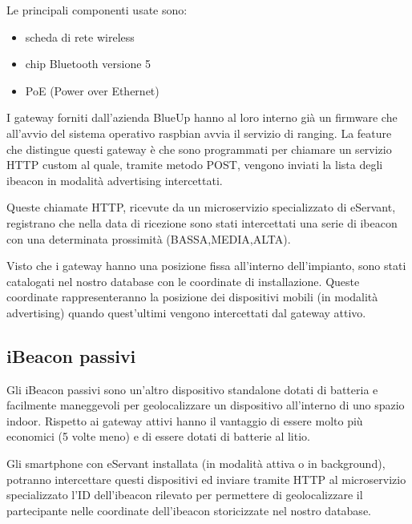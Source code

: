 Le principali componenti usate sono:
\begin{itemize}
    \item scheda di rete wireless
    \item chip Bluetooth versione 5
    \item PoE (Power over Ethernet)
\end{itemize}

I gateway forniti dall'azienda BlueUp hanno al loro interno già un firmware che all'avvio del sistema operativo
raspbian avvia il servizio di ranging.
La feature che distingue questi gateway è che sono programmati per chiamare un servizio HTTP custom 
al quale, tramite metodo POST, vengono inviati la lista degli ibeacon in modalità advertising intercettati.

Queste chiamate HTTP, ricevute da un microservizio specializzato di eServant, registrano che nella data
di ricezione sono stati intercettati una serie di ibeacon con una determinata prossimità (BASSA,MEDIA,ALTA).

Visto che i gateway hanno una posizione fissa all'interno dell'impianto, sono stati catalogati nel nostro
database con le coordinate di installazione.
Queste coordinate rappresenteranno la posizione dei dispositivi mobili (in modalità advertising) quando quest'ultimi
vengono intercettati dal gateway attivo.

\subsection{iBeacon passivi}
Gli iBeacon passivi sono un'altro dispositivo standalone dotati di batteria e facilmente maneggevoli per
geolocalizzare un dispositivo all'interno di uno spazio indoor.
Rispetto ai gateway attivi hanno il vantaggio di essere molto più economici (5 volte meno) e di essere
dotati di batterie al litio.

Gli smartphone con eServant installata (in modalità attiva o in background), potranno intercettare
questi dispositivi ed inviare tramite HTTP al microservizio specializzato l'ID dell'ibeacon rilevato
per permettere di geolocalizzare il partecipante nelle coordinate dell'ibeacon storicizzate nel nostro
database.

